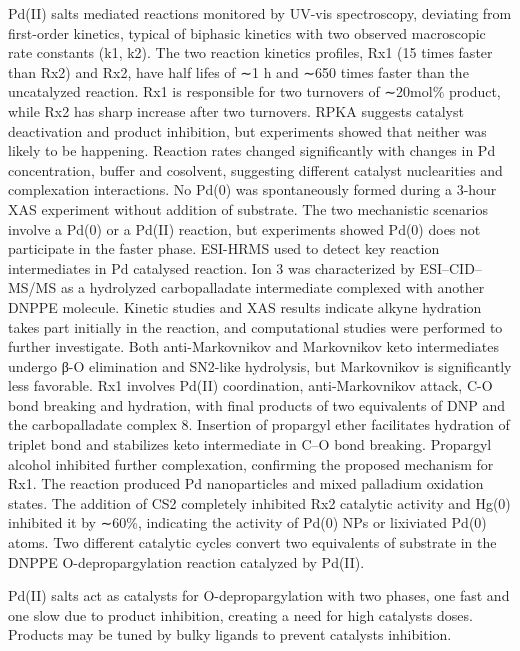 Pd(II) salts mediated reactions monitored by UV-vis spectroscopy, deviating from first-order kinetics, typical of biphasic kinetics with two observed macroscopic rate constants (k1, k2).
The two reaction kinetics profiles, Rx1 (15 times faster than Rx2) and Rx2, have half lifes of ∼1 h and ∼650 times faster than the uncatalyzed reaction.
Rx1 is responsible for two turnovers of ∼20mol\% product, while Rx2 has sharp increase after two turnovers.
RPKA suggests catalyst deactivation and product inhibition, but experiments showed that neither was likely to be happening.
Reaction rates changed significantly with changes in Pd concentration, buffer and cosolvent, suggesting different catalyst nuclearities and complexation interactions.
No Pd(0) was spontaneously formed during a 3-hour XAS experiment without addition of substrate.
The two mechanistic scenarios involve a Pd(0) or a Pd(II) reaction, but experiments showed Pd(0) does not participate in the faster phase.
ESI-HRMS used to detect key reaction intermediates in Pd catalysed reaction.
Ion 3 was characterized by ESI–CID–MS/MS as a hydrolyzed carbopalladate intermediate complexed with another DNPPE molecule.
Kinetic studies and XAS results indicate alkyne hydration takes part initially in the reaction, and computational studies were performed to further investigate.
Both anti-Markovnikov and Markovnikov keto intermediates undergo β-O elimination and SN2-like hydrolysis, but Markovnikov is significantly less favorable.
Rx1 involves Pd(II) coordination, anti-Markovnikov attack, C-O bond breaking and hydration, with final products of two equivalents of DNP and the carbopalladate complex 8.
Insertion of propargyl ether facilitates hydration of triplet bond and stabilizes keto intermediate in C–O bond breaking.
Propargyl alcohol inhibited further complexation, confirming the proposed mechanism for Rx1.
The reaction produced Pd nanoparticles and mixed palladium oxidation states.
The addition of CS2 completely inhibited Rx2 catalytic activity and Hg(0) inhibited it by ∼60\%, indicating the activity of Pd(0) NPs or lixiviated Pd(0) atoms.
Two different catalytic cycles convert two equivalents of substrate in the DNPPE O-depropargylation reaction catalyzed by Pd(II).

Pd(II) salts act as catalysts for O-depropargylation with two phases, one fast and one slow due to product inhibition, creating a need for high catalysts doses.
Products may be tuned by bulky ligands to prevent catalysts inhibition.


